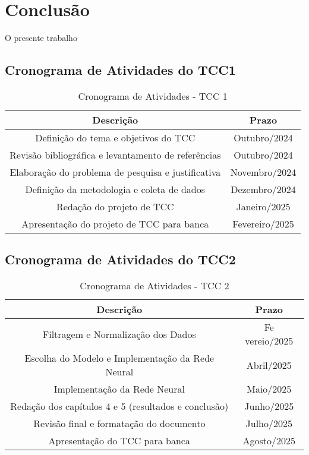 \chapter[Conclusão]{Conclusão}

O presente trabalho

\section{Cronograma de Atividades do TCC1}

\begin{table}[h!]
\centering
\caption{Cronograma de Atividades - TCC 1}
\label{tab:tcc1}
\begin{tabular}{c|c}
\hline
  \textbf{Descrição} & \textbf{Prazo} \\ \hline
Definição do tema e objetivos do TCC & Outubro/2024 \\ 
Revisão bibliográfica e levantamento de referências & Outubro/2024 \\ 
Elaboração do problema de pesquisa e justificativa & Novembro/2024 \\ 
Definição da metodologia e coleta de dados & Dezembro/2024 \\ 
Redação do projeto de TCC & Janeiro/2025 \\ 
Apresentação do projeto de TCC para banca & Fevereiro/2025 \\  \hline
\end{tabular}
\end{table}

\section{Cronograma de Atividades do TCC2}


\begin{table}[h!]
\centering
\caption{Cronograma de Atividades - TCC 2}
\label{tab:tcc2}
\begin{tabular}{c|c}
\hline
\textbf{Descrição} & \textbf{Prazo} \\ \hline
Filtragem e Normalização dos Dados & Fe vereio/2025 \\ 
Escolha do Modelo e Implementação da Rede Neural & Abril/2025 \\ 
Implementação da Rede Neural & Maio/2025 \\ 
Redação dos capítulos 4 e 5 (resultados e conclusão) & Junho/2025 \\ 
Revisão final e formatação do documento & Julho/2025 \\ \hline
Apresentação do TCC para banca & Agosto/2025 \\ \hline
\end{tabular}
\end{table}